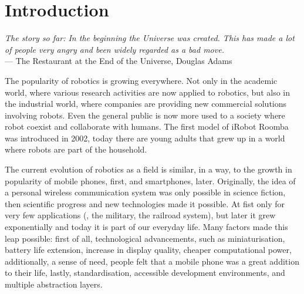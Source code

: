 \chapter{Introduction}\label{ch:introduction}

\begin{flushright}{\slshape The story so far: In the beginning the Universe was created. This has made a lot of people very angry and been widely regarded as a bad move.} \\ \medskip
    ---  The Restaurant at the End of the Universe, Douglas Adams 
\end{flushright}

The popularity of robotics is growing everywhere. Not only in the academic world, where various research activities are now applied to robotics, but also in the industrial world, where companies are providing new commercial solutions involving robots. Even the general public is now more used to a society where robot coexist and collaborate with humans. The first model of iRobot Roomba was introduced in 2002, today there are young adults that grew up in a world where robots are part of the household.

The current evolution of robotics as a field is similar, in a way, to the growth in popularity of mobile phones, first, and smartphones, later.  Originally, the idea of a personal wireless communication system was only possible in science fiction, then scientific progress and new technologies made it possible. At fist only for very few applications (\eg, the military, the railroad system), but later it grew exponentially and today it is part of our everyday life. Many factors made this leap possible: first of all, technological advancements, such as miniaturisation, battery life extension, increase in display quality, cheaper computational power, additionally, a sense of need, people felt that a mobile phone was a great addition to their life, lastly, standardisation, accessible development environments, and multiple abstraction layers.

